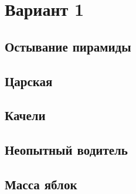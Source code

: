 
\usepackage{libertine}

\section*{Вариант 1}\firsttrue\secondfalse
\subsection{Остывание пирамиды}
\clearpage
\subsection{Царская}
\clearpage
\subsection{Качели}
\clearpage
\subsection{Неопытный водитель}
\clearpage
\subsection{Масса яблок}
\clearpage

